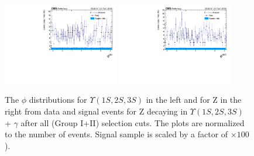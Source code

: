 \begin{figure}[!htbp]
\begin{center}
\includegraphics[width=0.45\textwidth]{figures_and_tables/outputPlots/ZtoUpsilon_Cat0_ZZZZZ/nEvts/data_x_mc/withKinCuts/h_withKin_Upsilon_phi}\hspace*{1.cm}
\includegraphics[width=0.45\textwidth]{figures_and_tables/outputPlots/ZtoUpsilon_Cat0_ZZZZZ/nEvts/data_x_mc/withKinCuts/h_withKin_Z_phi}
\end{center}\vspace*{-.5cm}
\caption{The $\phi$ distributions for $\Upsilon(1S,2S,3S)$ in the left and for Z in the right from data and signal events for Z decaying in $\Upsilon(1S,2S,3S)$ + $\gamma$ after all (Group I+II) selection cuts. The plots are normalized to the number of events. Signal sample is scaled by a factor of $\times 100$).}
\label{fig:phiUpsilon_and_Z_ZtoUpsilon_Cat0_groupI_plus_II}
\end{figure}


